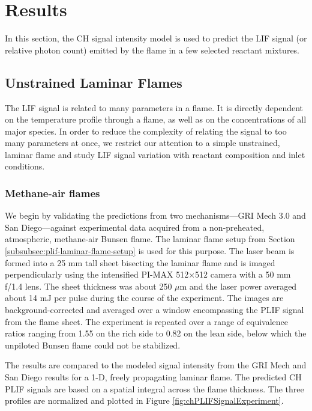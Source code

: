 \section{Results}

In this section, the CH signal intensity model is used to predict the LIF signal (or relative photon count) emitted by the flame in a few selected reactant mixtures.

\subsection{Unstrained Laminar Flames}

The LIF signal is related to many parameters in a flame.
It is directly dependent on the temperature profile through a flame, as well as on the concentrations of all major species.
In order to reduce the complexity of relating the signal to too many parameters at once, we restrict our attention to a simple unstrained, laminar flame and study LIF signal variation with reactant composition and inlet conditions.

\subsubsection{Methane-air flames}

We begin by validating the predictions from two mechanisms---GRI Mech 3.0 and San Diego---against experimental data acquired from a non-preheated, atmospheric, methane-air Bunsen flame.
The laminar flame setup from Section \ref{subsubsec:plif-laminar-flame-setup} is used for this purpose.
The laser beam is formed into a 25 mm tall sheet bisecting the laminar flame and is imaged perpendicularly using the intensified PI-MAX 512\(\times\)512 camera with a 50 mm f/1.4 lens.
The sheet thickness was about 250 \(\mu\)m and the laser power averaged about 14 mJ per pulse during the course of the experiment.
The images are background-corrected and averaged over a window encompassing the PLIF signal from the flame sheet.
The experiment is repeated over a range of equivalence ratios ranging from 1.55 on the rich side to 0.82 on the lean side, below which the unpiloted Bunsen flame could not be stabilized.

The results are compared to the modeled signal intensity from the GRI Mech and San Diego results for a 1-D, freely propagating laminar flame.
The predicted CH PLIF signals are based on a spatial integral across the flame thickness.
The three profiles are normalized and plotted in Figure \ref{fig:chPLIFSignalExperiment}.

